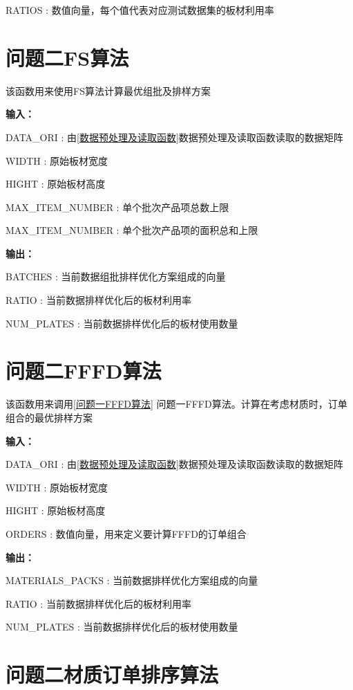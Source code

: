 \documentclass[bwprint]{gmcmthesis}
\begin{document}
RATIOS : 数值向量，每个值代表对应测试数据集的板材利用率


\newpage
\section{问题二FS算法}
该函数用来使用FS算法计算最优组批及排样方案

\textbf{输入：} 

DATA\_ORI : 由\ref{数据预处理及读取函数}数据预处理及读取函数读取的数据矩阵

WIDTH : 原始板材宽度

HIGHT : 原始板材高度

MAX\_ITEM\_NUMBER : 单个批次产品项总数上限

MAX\_ITEM\_NUMBER : 单个批次产品项的面积总和上限

\textbf{输出：} 

BATCHES : 当前数据组批排样优化方案组成的向量

RATIO : 当前数据排样优化后的板材利用率

NUM\_PLATES : 当前数据排样优化后的板材使用数量


\newpage
\section{问题二FFFD算法}
该函数用来调用\ref{问题一FFFD算法} 问题一FFFD算法。计算在考虑材质时，订单组合的最优排样方案

\textbf{输入：} 

DATA\_ORI : 由\ref{数据预处理及读取函数}数据预处理及读取函数读取的数据矩阵

WIDTH : 原始板材宽度

HIGHT : 原始板材高度

ORDERS : 数值向量，用来定义要计算FFFD的订单组合

\textbf{输出：} 

MATERIALS\_PACKS : 当前数据排样优化方案组成的向量

RATIO : 当前数据排样优化后的板材利用率

NUM\_PLATES : 当前数据排样优化后的板材使用数量


\newpage
\section{问题二材质订单排序算法}
\end{document}
